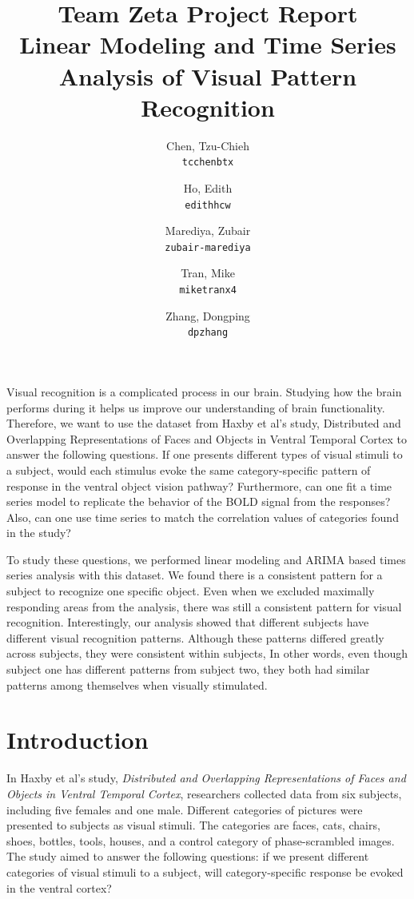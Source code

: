 \documentclass[11pt,twocolumn]{article}
\title{\textbf{Team Zeta Project Report}\\
Linear Modeling and Time Series Analysis of Visual Pattern Recognition}
\author{
  Chen, Tzu-Chieh\\
  \texttt{tcchenbtx}
  \and
  Ho, Edith\\
  \texttt{edithhcw}
  \and
  Marediya, Zubair\\
  \texttt{zubair-marediya}
  \and
  Tran, Mike\\
  \texttt{miketranx4}
  \and
  Zhang, Dongping\\
  \texttt{dpzhang}
}
\begin{document}
\maketitle

\abstract{}
Visual recognition is a complicated process in our brain. Studying how the brain
 performs during it helps us improve our understanding of brain functionality. 
 Therefore, we want to use the dataset from Haxby et al's study, Distributed and 
 Overlapping Representations of Faces and Objects in Ventral Temporal Cortex 
 to answer the following questions. If one presents different types of visual 
 stimuli to a subject, would each stimulus evoke the same category-specific 
 pattern of response in the ventral object vision pathway? Furthermore, can 
 one fit a time series model to replicate the behavior of the BOLD signal from 
 the responses? Also, can one use time series to match the correlation values 
 of categories found in the study? 

To study these questions, we performed linear modeling and ARIMA based 
times series analysis with this dataset. We found there is a consistent pattern 
for a subject to recognize one specific object. Even when we excluded maximally 
responding areas from the analysis, there was still a consistent pattern for visual 
recognition. Interestingly, our analysis showed that different subjects have 
different visual recognition patterns. Although these patterns differed greatly 
across subjects, they were consistent within subjects, In other words, even 
though subject one has different patterns from subject two, they both had 
similar patterns among themselves when visually stimulated.

\section{Introduction}

In Haxby et al's study, \emph{Distributed and Overlapping Representations of Faces
and Objects in Ventral Temporal Cortex}\cite{objectrec}, researchers collected data 
from six subjects, including five females and one male. 
Different categories of pictures were presented to subjects as visual stimuli.
The categories are faces, cats, chairs, shoes, bottles, tools, houses, 
and a control category of phase-scrambled images.
The study aimed to answer the following questions: if we present 
different categories of visual stimuli to a subject, will category-specific response be 
evoked in the ventral cortex? \\
\end{document}
